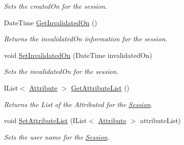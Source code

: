 \begin{DoxyCompactItemize}
\begin{DoxyCompactList}\small\item\em Sets the created\+On for the session. \end{DoxyCompactList}\item 
Date\+Time \hyperlink{classcom_1_1shephertz_1_1app42_1_1paas_1_1sdk_1_1csharp_1_1session_1_1_session_a48abb68fa0c82d0b780c276eeb2069c3}{Get\+Invalidated\+On} ()
\begin{DoxyCompactList}\small\item\em Returns the invalidated\+On information for the session. \end{DoxyCompactList}\item 
void \hyperlink{classcom_1_1shephertz_1_1app42_1_1paas_1_1sdk_1_1csharp_1_1session_1_1_session_a6b8d5d4b8f216fa653f07f80a7fc28c3}{Set\+Invalidated\+On} (Date\+Time invalidated\+On)
\begin{DoxyCompactList}\small\item\em Sets the invalidated\+On for the session. \end{DoxyCompactList}\item 
I\+List$<$ \hyperlink{classcom_1_1shephertz_1_1app42_1_1paas_1_1sdk_1_1csharp_1_1session_1_1_session_1_1_attribute}{Attribute} $>$ \hyperlink{classcom_1_1shephertz_1_1app42_1_1paas_1_1sdk_1_1csharp_1_1session_1_1_session_a33b599e4c09c6a7613c28e1fa483287f}{Get\+Attribute\+List} ()
\begin{DoxyCompactList}\small\item\em Returns the List of the Attributed for the \hyperlink{classcom_1_1shephertz_1_1app42_1_1paas_1_1sdk_1_1csharp_1_1session_1_1_session}{Session}. \end{DoxyCompactList}\item 
void \hyperlink{classcom_1_1shephertz_1_1app42_1_1paas_1_1sdk_1_1csharp_1_1session_1_1_session_a5d357afd7b32737b22b0feebf6becb17}{Set\+Attribute\+List} (I\+List$<$ \hyperlink{classcom_1_1shephertz_1_1app42_1_1paas_1_1sdk_1_1csharp_1_1session_1_1_session_1_1_attribute}{Attribute} $>$ attribute\+List)
\begin{DoxyCompactList}\small\item\em Sets the user name for the \hyperlink{classcom_1_1shephertz_1_1app42_1_1paas_1_1sdk_1_1csharp_1_1session_1_1_session}{Session}. \end{DoxyCompactList}\end{DoxyCompactItemize}
